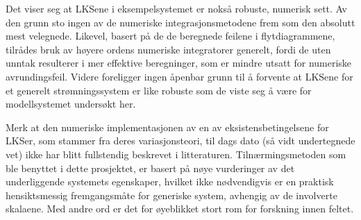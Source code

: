 Det viser seg at LKSene i eksempelsystemet er nokså robuste, numerisk sett. Av
den grunn sto ingen av de numeriske integrasjonsmetodene frem som den absolutt
mest velegnede. Likevel, basert på de de beregnede feilene i flytdiagrammene,
tilrådes bruk av høyere ordens numeriske integratorer generelt, fordi de uten
unntak resulterer i mer effektive beregninger,
som er mindre utsatt for numeriske avrundingsfeil. Videre foreligger ingen
åpenbar grunn til å forvente at LKSene for et generelt strømningssystem er like
robuste som de viste seg å være for modellsystemet undersøkt her.

Merk at den numeriske implementasjonen av en av eksistensbetingelsene for
LKSer, som stammer fra deres variasjonsteori, til dags dato (så vidt
undertegnede vet) ikke har blitt fullstendig beskrevet i litteraturen.
Tilnærmingsmetoden som ble benyttet i
dette prosjektet, er basert på nøye vurderinger av det underliggende systemets
egenskaper, hvilket ikke nødvendigvis er en praktisk hensiktsmessig
fremgangsmåte for generiske system, avhengig av de involverte skalaene. Med
andre ord er det for øyeblikket stort rom for forskning innen feltet.
